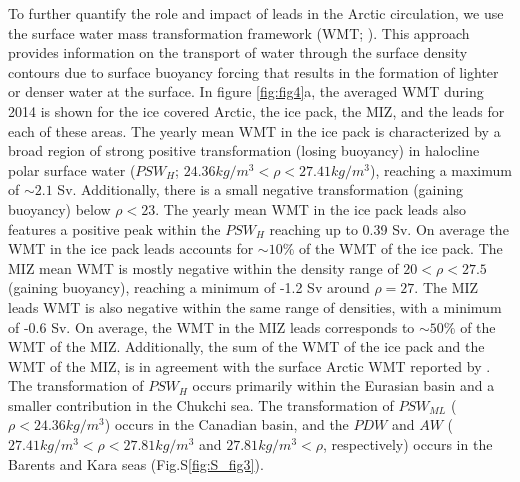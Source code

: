 \documentclass[lineno,sn-basic]{sn-jnl}%
\begin{document}
To further quantify the role and impact of leads in the Arctic circulation, we use the surface water mass transformation framework (WMT; \citealp{Walin_WMT_1982}). This approach provides information on the transport of water through the surface density contours due to surface buoyancy forcing that results in the  formation of lighter or denser water at the surface.
In figure \ref{fig:fig4}a, the averaged WMT during 2014 is shown for the ice covered Arctic, the ice pack, the MIZ, and the leads for each of these areas.
The yearly mean WMT in the ice pack is characterized by a broad region of strong positive transformation (losing buoyancy) in halocline polar surface water ($PSW_{H}$; $24.36 kg/m^3 < \rho < 27.41 kg/m^3$), reaching a maximum of $\sim 2.1$ Sv. Additionally, there is a small negative transformation (gaining buoyancy) below $\rho < 23$. 
The yearly mean WMT in the ice pack leads also features a positive peak within the $PSW_{H}$ reaching up to 0.39 Sv. On average the WMT in the ice pack leads accounts for $\sim 10\%$ of the WMT of the ice pack. The MIZ mean WMT is mostly negative within the density range of $20 < \rho < 27.5$ (gaining buoyancy), reaching a minimum of -1.2 Sv around $\rho = 27$.  The MIZ leads WMT is also negative within the same range of densities, with a minimum of -0.6 Sv. On average, the WMT in the MIZ leads corresponds to $\sim 50\%$ of the WMT of the MIZ. Additionally, the sum of the WMT of the ice pack and the WMT of the MIZ, is in agreement with the surface Arctic WMT reported by \citet{Pemberton_WMT_2015}. The transformation of $PSW_{H}$ occurs primarily within the Eurasian basin and a smaller contribution in the Chukchi sea. The transformation of $PSW_{ML}$ ($\rho < 24.36 kg/m^3$) occurs in the Canadian basin, and the $PDW$ and $AW$ ($27.41 kg/m^3 < \rho < 27.81 kg/m^3$ and $27.81 kg/m^3 < \rho$, respectively) occurs in the Barents and Kara seas (Fig.S\ref{fig:S_fig3}). 
\end{document}
